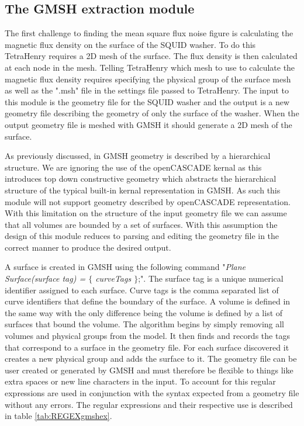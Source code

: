 \subsection{The GMSH extraction module}
The first challenge to finding the mean square flux noise figure is calculating the magnetic flux density on the surface of the SQUID washer. To do this TetraHenry requires a 2D mesh of the surface. The flux density is then calculated at each node in the mesh. Telling TetraHenry which mesh to use to calculate the magnetic flux density requires specifying the physical group of the surface mesh as well as the ".msh" file in the settings file passed to TetraHenry. The input to this module is the geometry file for the SQUID washer and the output is a new geometry file describing the geometry of only the surface of the washer. When the output geometry file is meshed with GMSH it should generate a 2D mesh of the surface. \par
As previously discussed, in GMSH geometry is described by a hierarchical structure. We are ignoring the use of the openCASCADE kernal as this introduces top down constructive geometry which abstracts the hierarchical structure of the typical built-in kernal representation in GMSH. As such this module will not support geometry described by openCASCADE representation. With this limitation on the structure of the input geometry file we can assume that all volumes are bounded by a set of surfaces. With this assumption the design of this module reduces to parsing and editing the geometry file in the correct manner to produce the desired output. \par
A surface is created in GMSH using the following command "\textit{Plane Surface(surface tag) = $\{$ curveTags $\}$};". The surface tag is a unique numerical identifier assigned to each surface. Curve tags is the comma separated list of curve identifiers that define the boundary of the surface. A volume is defined in the same way with the only difference being the volume is defined by a list of surfaces that bound the volume. The algorithm begins by simply removing all volumes and physical groups from the model. It then finds and records the tags that correspond to a surface in the geometry file. For each surface discovered it creates a new physical group and adds the surface to it. The geometry file can be user created or generated by GMSH and must therefore be flexible to things like extra spaces or new line characters in the input. To account for this regular expressions are used in conjunction with the syntax expected from a geometry file without any errors. The regular expressions and their respective use is described in table \ref{tab:REGEXgmshex}.

